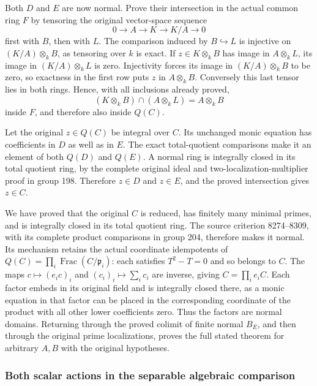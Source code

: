 Both \(D\) and \(E\) are now normal. Prove their intersection in the actual common ring \(F\) by tensoring the original vector-space sequence \[
 0\longrightarrow A\longrightarrow K\longrightarrow K/A\longrightarrow0
\] first with \(B\), then with \(L\). The comparison induced by \(B\hookrightarrow L\) is injective on \((K/A)\otimes_kB\), as tensoring over \(k\) is exact. If \(z\in K\otimes_kB\) has image in \(A\otimes_kL\), its image in \((K/A)\otimes_kL\) is zero. Injectivity forces its image in \((K/A)\otimes_kB\) to be zero, so exactness in the first row puts \(z\) in \(A\otimes_kB\). Conversely this last tensor lies in both rings. Hence, with all inclusions already proved, \[
 (K\otimes_kB)\cap(A\otimes_kL)=A\otimes_kB
\] inside \(F\), and therefore also inside \(Q(C)\).

Let the original \(z\in Q(C)\) be integral over \(C\). Its unchanged monic equation has coefficients in \(D\) as well as in \(E\). The exact total-quotient comparisons make it an element of both \(Q(D)\) and \(Q(E)\). A normal ring is integrally closed in its total quotient ring, by the complete original ideal and two-localization-multiplier proof in group 198. Therefore \(z\in D\) and \(z\in E\), and the proved intersection gives \(z\in C\).

We have proved that the original \(C\) is reduced, has finitely many minimal primes, and is integrally closed in its total quotient ring. The source criterion 8274--8309, with its complete product comparisons in group 204, therefore makes it normal. Its mechanism retains the actual coordinate idempotents of \(Q(C)=\prod_i\operatorname{Frac}(C/\mathfrak p_i)\): each satisfies \(T^2-T=0\) and so belongs to \(C\). The maps \(c\mapsto(e_ic)_i\) and \((c_i)_i\mapsto\sum_i c_i\) are inverse, giving \(C=\prod_i e_iC\). Each factor embeds in its original field and is integrally closed there, as a monic equation in that factor can be placed in the corresponding coordinate of the product with all other lower coefficients zero. Thus the factors are normal domains. Returning through the proved colimit of finite normal \(B_E\), and then through the original prime localizations, proves the full stated theorem for arbitrary \(A,B\) with the original hypotheses.

\subsubsection{Both scalar actions in the separable algebraic comparison}\label{algebra-proof-070-both-scalar-actions-in-the-separable-algebraic-comparison}

